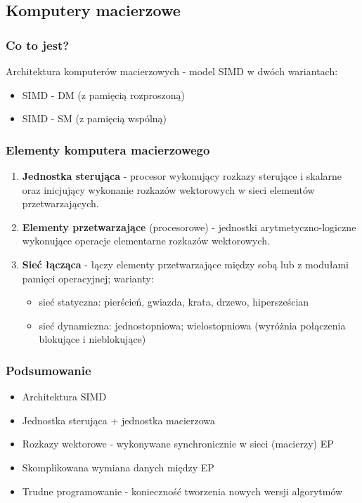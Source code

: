 	\subsection{Komputery macierzowe}
	\begin{samepage}
		\subsubsection{Co to jest?}
			Architektura komputerów macierzowych - model SIMD w dwóch wariantach:
			\begin{itemize}
				\item SIMD - DM (z pamięcią rozproszoną)
				\item SIMD - SM (z pamięcią wspólną)
			\end{itemize}
		\subsubsection{Elementy komputera macierzowego}
			\begin{enumerate}
				\item \textbf{Jednostka sterująca} - procesor wykonujący rozkazy sterujące i skalarne oraz inicjujący wykonanie rozkazów wektorowych w sieci elementów przetwarzających.
				\item \textbf{Elementy przetwarzające} (procesorowe) - jednostki arytmetyczno-logiczne wykonujące operacje elementarne rozkazów wektorowych.
				\item \textbf{Sieć łącząca} - łączy elementy przetwarzające między sobą lub z modułami pamięci operacyjnej; warianty:
				\begin{itemize}
					\item sieć statyczna: pierścień, gwiazda, krata, drzewo, hipersześcian
					\item sieć dynamiczna: jednostopniowa; wielostopniowa (wyróżnia połączenia blokujące i nieblokujące)
				\end{itemize}
			\end{enumerate}
	\end{samepage}
		\subsubsection{Podsumowanie}
			\begin{itemize}
				\item Architektura SIMD
				\item Jednostka sterująca + jednostka macierzowa
				\item Rozkazy wektorowe - wykonywane synchronicznie w sieci (macierzy) EP
				\item Skomplikowana wymiana danych między EP
				\item Trudne programowanie - konieczność tworzenia nowych wersji algorytmów
			\end{itemize}
	
